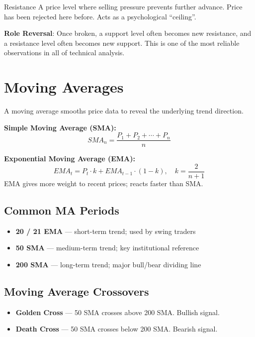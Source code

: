 \begin{keyterm}{Resistance}
A price level where selling pressure prevents further advance. Price has been rejected here
before. Acts as a psychological ``ceiling''.
\end{keyterm}

\begin{notebox}
\textbf{Role Reversal}: Once broken, a support level often becomes new resistance,
and a resistance level often becomes new support. This is one of the most reliable
observations in all of technical analysis.
\end{notebox}

\section{Moving Averages}

A moving average smooths price data to reveal the underlying trend direction.

\begin{formulabox}
\textbf{Simple Moving Average (SMA):}
\[
  SMA_n = \frac{P_1 + P_2 + \cdots + P_n}{n}
\]

\textbf{Exponential Moving Average (EMA):}
\[
  EMA_t = P_t \cdot k + EMA_{t-1} \cdot (1 - k), \quad k = \frac{2}{n+1}
\]
EMA gives more weight to recent prices; reacts faster than SMA.
\end{formulabox}

\subsection{Common MA Periods}
\begin{itemize}
  \item \textbf{20 / 21 EMA} — short-term trend; used by swing traders
  \item \textbf{50 SMA} — medium-term trend; key institutional reference
  \item \textbf{200 SMA} — long-term trend; major bull/bear dividing line
\end{itemize}

\subsection{Moving Average Crossovers}
\begin{itemize}
  \item \textbf{Golden Cross} — 50 SMA crosses above 200 SMA. Bullish signal.
  \item \textbf{Death Cross} — 50 SMA crosses below 200 SMA. Bearish signal.
\end{itemize}

